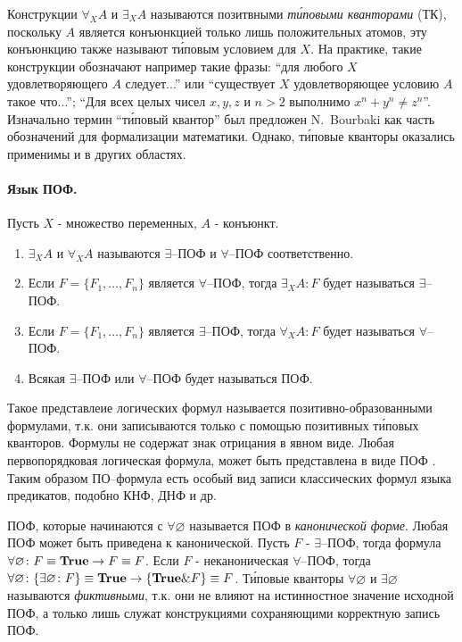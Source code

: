 \documentclass[a4paper]{jctart15b}
\begin{document}
Конструкции $\forall_XA$ и $\exists_XA$ называются позитвными \emph{т\'иповыми кванторами} (ТК), поскольку $A$ является конъюнкцией только лишь положительных атомов, эту конъюнкцию также называют т\'иповым условием для $X$. На практике, такие конструкции  обозначают например такие фразы: ``для любого $X$ удовлетворяющего $A$ следует...'' или ``существует $X$ удовлетворяющее условию $A$ такое что...''; ``Для всех целых чисел $x,y,z$ и $n>2$ выполнимо $x^n + y^n \ne z^n$''. Изначально термин ``т\'иповый квантор'' был предложен N.~Bourbaki \cite{Bourbaki} как часть обозначений для формализации математики. Однако, т\'иповые кванторы оказались применимы и в других областях.

\paragraph{Язык ПОФ.}

\begin{definition}
\label{def:pcf}
Пусть $X$ - множество переменных, $A$ - конъюнкт.
\begin{enumerate}

\item $\exists_XA$ и $\forall_XA$ называются $\exists$--ПОФ и $\forall$--ПОФ соответственно.

\item Если $F = \{F_1,\ldots,F_n\}$ является $\forall$--ПОФ, тогда $\exists_XA\colon F$ будет называться $\exists$--ПОФ.

\item Если $F = \{F_1,\ldots,F_n\}$ является $\exists$--ПОФ, тогда $\forall_XA\colon F$ будет называться $\forall$--ПОФ.

\item Всякая $\exists$--ПОФ или $\forall$--ПОФ будет называться ПОФ.
\end{enumerate}
\end{definition}

Такое представлеие логических формул называется позитивно-образованными формулами, т.к. они записываются только с помощью позитивных т\'иповых кванторов. Формулы не содержат знак отрицания в явном виде. Любая первопорядковая логическая формула, может быть представлена в виде ПОФ \cite{ICDS2000}. Таким образом ПО--формула есть особый вид записи классических формул языка предикатов, подобно КНФ, ДНФ и др.

ПОФ, которые начинаются с $\forall \varnothing$ называется ПОФ в {\em канонической форме}. Любая ПОФ может быть приведена к канонической. Пусть $F$ - $\exists$--ПОФ, тогда формула $\forall \varnothing\colon F \equiv \text{\textbf{True}} \rightarrow F \equiv F$. Если $F$ - неканоническая $\forall$--ПОФ, тогда $\forall \varnothing\colon\{\exists \varnothing\colon F\} \equiv \text{\textbf{True}} \rightarrow \{\text{\textbf{True}}\&F\} \equiv F$. Т\'иповые кванторы $\forall \varnothing$ и $\exists \varnothing$ называются {\em фиктивными}, т.к. они не влияют на истинностное значение исходной ПОФ, а только лишь служат конструкциями сохраняющими корректную запись ПОФ.
\end{document}
